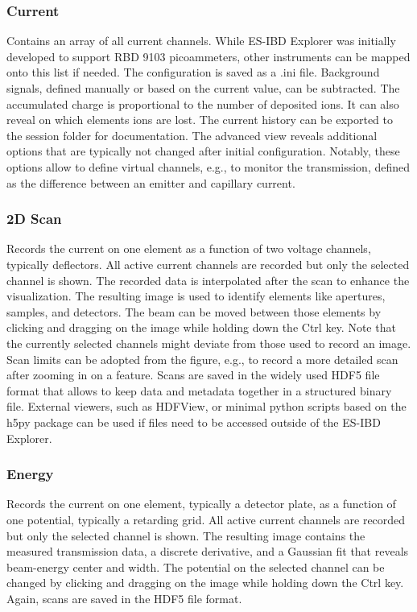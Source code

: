 \documentclass[a4paper,11pt,DIV=13]{scrartcl}
\begin{document}
\subsubsection{Current}
Contains an array of all current channels. While ES-IBD Explorer was initially developed to support RBD 9103 picoammeters, other instruments can be mapped onto this list if needed. The configuration is saved as a .ini file. Background signals, defined manually or based on the current value, can be subtracted. The accumulated charge is proportional to the number of deposited ions. It can also reveal on which elements ions are lost. The current history can be exported to the session folder for documentation. The advanced view reveals additional options that are typically not changed after initial configuration. Notably, these options allow to define virtual channels, e.g., to monitor the transmission, defined as the difference between an emitter and capillary current.

\subsubsection{2D Scan}
Records the current on one element as a function of two voltage channels, typically deflectors. All active current channels are recorded but only the selected channel is shown. The recorded data is interpolated after the scan to enhance the visualization. The resulting image is used to identify elements like apertures, samples, and detectors. The beam can be moved between those elements by clicking and dragging on the image while holding down the Ctrl key. Note that the currently selected channels might deviate from those used to record an image. Scan limits can be adopted from the figure, e.g., to record a more detailed scan after zooming in on a feature. Scans are saved in the widely used HDF5 file format that allows to keep data and metadata together in a structured binary file. External viewers, such as HDFView, or minimal python scripts based on the h5py package can be used if files need to be accessed outside of the ES-IBD Explorer.

\subsubsection{Energy}
Records the current on one element, typically a detector plate, as a function of one potential, typically a retarding grid. All active current channels are recorded but only the selected channel is shown. The resulting image contains the measured transmission data, a discrete derivative, and a Gaussian fit that reveals beam-energy center and width. The potential on the selected channel can be changed by clicking and dragging on the image while holding down the Ctrl key. Again, scans are saved in the HDF5 file format.
\end{document}
